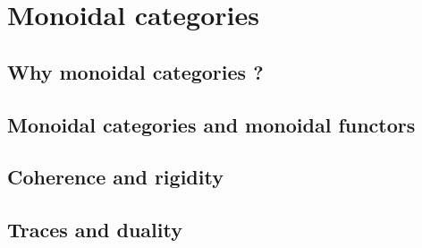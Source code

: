 \section{Monoidal categories}
    \subsection{Why monoidal categories ?}

    \subsection{Monoidal categories and monoidal functors}

    \subsection{Coherence and rigidity}

    \subsection{Traces and duality}